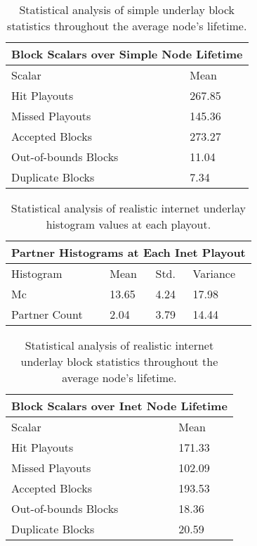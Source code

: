 \documentclass[12pt,a4paper]{article}
\begin{document}
\begin{table}[h!]
	\centering
	\begin{tabular}{ |p{6cm}||p{3cm}|  }
		\hline
		\multicolumn{2}{|c|}{Block Scalars over Simple Node Lifetime} \\
		\hline
		Scalar & Mean \\
		\hline
		Hit Playouts   & 267.85 \\
		Missed Playouts   & 145.36 \\
		Accepted Blocks   & 273.27 \\
		Out-of-bounds Blocks   & 11.04 \\
		Duplicate Blocks   & 7.34 \\
		\hline
	\end{tabular} 
	\caption{Statistical analysis of simple underlay block statistics throughout the average node's lifetime.}
	\label{simple_scalar}
\end{table}

\begin{table}[h!]
	\centering
	\begin{tabular}{ |p{3cm}||p{3cm}|p{3cm}|p{3cm}|  }
		\hline
		\multicolumn{4}{|c|}{Partner Histograms at Each Inet Playout} \\
		\hline
		Histogram & Mean & Std. & Variance \\
		\hline
		Mc   & 13.65    & 4.24 &   17.98\\
		Partner Count &   2.04  & 3.79  & 14.44 \\
		\hline
	\end{tabular} 
	\caption{Statistical analysis of realistic internet underlay histogram values at each playout.}
	\label{inet_histogram}
\end{table}

\begin{table}[h!]
	\centering
	\begin{tabular}{ |p{6cm}||p{3cm}|  }
		\hline
		\multicolumn{2}{|c|}{Block Scalars over Inet Node Lifetime} \\
		\hline
		Scalar & Mean \\
		\hline
		Hit Playouts   & 171.33 \\
		Missed Playouts   & 102.09 \\
		Accepted Blocks   & 193.53 \\
		Out-of-bounds Blocks   & 18.36 \\
		Duplicate Blocks   & 20.59 \\
		\hline
	\end{tabular} 
	\caption{Statistical analysis of realistic internet underlay block statistics throughout the average node's lifetime.}
	\label{inet_scalar}
\end{table}
\end{document}

